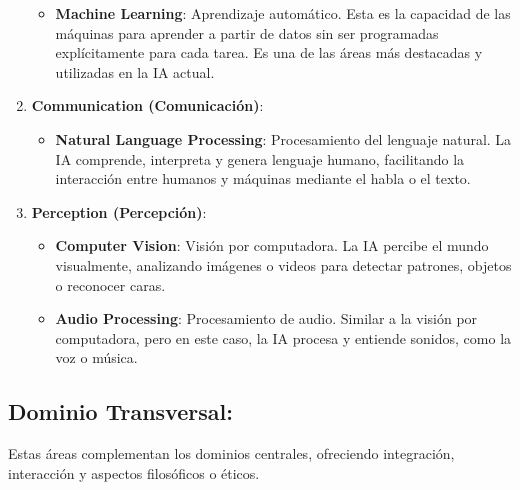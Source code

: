 \documentclass[
  10pt,
  letterpaper,
]{book}
\providecommand{\tightlist}{%
  \setlength{\itemsep}{0pt}\setlength{\parskip}{0pt}}\usepackage{longtable,booktabs,array}
\begin{document}
\begin{enumerate}
  \begin{itemize}
  \tightlist
  \item
    \textbf{Machine Learning}: Aprendizaje automático. Esta es la
    capacidad de las máquinas para aprender a partir de datos sin ser
    programadas explícitamente para cada tarea. Es una de las áreas más
    destacadas y utilizadas en la IA actual.
  \end{itemize}
\item
  \textbf{Communication (Comunicación)}:

  \begin{itemize}
  \tightlist
  \item
    \textbf{Natural Language Processing}: Procesamiento del lenguaje
    natural. La IA comprende, interpreta y genera lenguaje humano,
    facilitando la interacción entre humanos y máquinas mediante el
    habla o el texto.
  \end{itemize}
\item
  \textbf{Perception (Percepción)}:

  \begin{itemize}
  \tightlist
  \item
    \textbf{Computer Vision}: Visión por computadora. La IA percibe el
    mundo visualmente, analizando imágenes o videos para detectar
    patrones, objetos o reconocer caras.
  \item
    \textbf{Audio Processing}: Procesamiento de audio. Similar a la
    visión por computadora, pero en este caso, la IA procesa y entiende
    sonidos, como la voz o música.
  \end{itemize}
\end{enumerate}

\subsection{Dominio Transversal:}\label{dominio-transversal}

Estas áreas complementan los dominios centrales, ofreciendo integración,
interacción y aspectos filosóficos o éticos.
\end{document}
